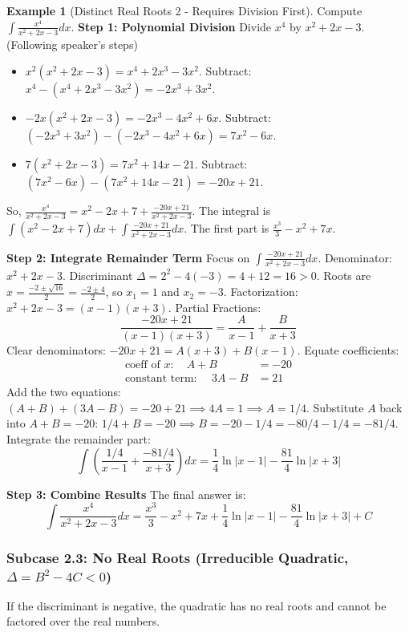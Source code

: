 \documentclass[11pt]{article}
\theoremstyle{plain}
\theoremstyle{definition}
\newtheorem{example}[theorem]{Example}
\theoremstyle{remark}
\newcommand{\abs}[1]{\left|#1\right|}
\begin{document}
\begin{example}[Distinct Real Roots 2 - Requires Division First]
Compute $\int \frac{x^4}{x^2+2x-3} dx$.
\textbf{Step 1: Polynomial Division}
Divide $x^4$ by $x^2+2x-3$. (Following speaker's steps)
\begin{itemize}
    \item $x^2(x^2+2x-3) = x^4+2x^3-3x^2$. Subtract: $x^4 - (x^4+2x^3-3x^2) = -2x^3+3x^2$.
    \item $-2x(x^2+2x-3) = -2x^3-4x^2+6x$. Subtract: $(-2x^3+3x^2) - (-2x^3-4x^2+6x) = 7x^2-6x$.
    \item $7(x^2+2x-3) = 7x^2+14x-21$. Subtract: $(7x^2-6x) - (7x^2+14x-21) = -20x+21$.
\end{itemize}
So, $\frac{x^4}{x^2+2x-3} = x^2-2x+7 + \frac{-20x+21}{x^2+2x-3}$.
The integral is $\int (x^2-2x+7) dx + \int \frac{-20x+21}{x^2+2x-3} dx$.
The first part is $\frac{x^3}{3} - x^2 + 7x$.

\textbf{Step 2: Integrate Remainder Term}
Focus on $\int \frac{-20x+21}{x^2+2x-3} dx$.
Denominator: $x^2+2x-3$. Discriminant $\Delta = 2^2 - 4(-3) = 4+12 = 16 > 0$.
Roots are $x = \frac{-2 \pm \sqrt{16}}{2} = \frac{-2 \pm 4}{2}$, so $x_1 = 1$ and $x_2 = -3$.
Factorization: $x^2+2x-3 = (x-1)(x+3)$.
Partial Fractions:
\[ \frac{-20x+21}{(x-1)(x+3)} = \frac{A}{x-1} + \frac{B}{x+3} \]
Clear denominators: $-20x+21 = A(x+3) + B(x-1)$.
Equate coefficients:
\begin{align*} \text{coeff of } x: \quad A+B &= -20 \\ \text{constant term: } \quad 3A-B &= 21 \end{align*}
Add the two equations: $(A+B)+(3A-B) = -20+21 \implies 4A = 1 \implies A = 1/4$.
Substitute $A$ back into $A+B=-20$: $1/4 + B = -20 \implies B = -20 - 1/4 = -80/4 - 1/4 = -81/4$.
Integrate the remainder part:
\[ \int \left( \frac{1/4}{x-1} + \frac{-81/4}{x+3} \right) dx = \frac{1}{4} \ln\abs{x-1} - \frac{81}{4} \ln\abs{x+3} \]

\textbf{Step 3: Combine Results}
The final answer is:
\[ \int \frac{x^4}{x^2+2x-3} dx = \frac{x^3}{3} - x^2 + 7x + \frac{1}{4} \ln\abs{x-1} - \frac{81}{4} \ln\abs{x+3} + C \]
\end{example}

\subsubsection{Subcase 2.3: No Real Roots (Irreducible Quadratic, $\Delta = B^2-4C < 0$)}

If the discriminant is negative, the quadratic has no real roots and cannot be factored over the real numbers.
\end{document}
